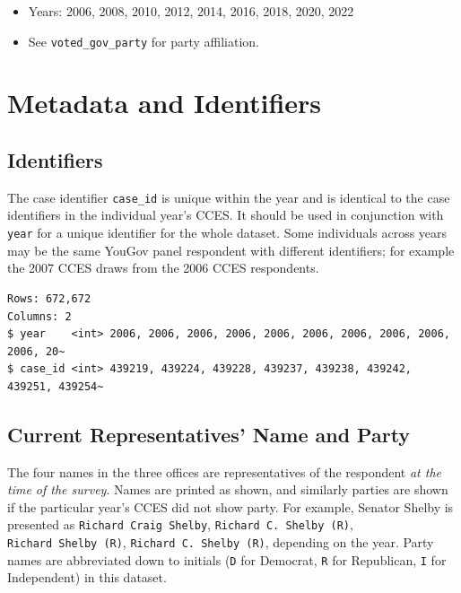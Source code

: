 \documentclass[10pt,article,oneside]{memoir}
\theoremstyle{definition}
\begin{document}
\begin{itemize}
\tightlist
\item
  Years: 2006, 2008, 2010, 2012, 2014, 2016, 2018, 2020, 2022
\item
  See \texttt{voted\_gov\_party} for party affiliation.
\end{itemize}

\newpage

\section{Metadata and Identifiers}\label{metadata-and-identifiers}

\subsection{Identifiers}\label{identifiers}

The case identifier \texttt{case\_id} is unique within the year and is
identical to the case identifiers in the individual year's CCES. It
should be used in conjunction with \texttt{year} for a unique identifier
for the whole dataset. Some individuals across years may be the same
YouGov panel respondent with different identifiers; for example the 2007
CCES draws from the 2006 CCES respondents.

\begin{verbatim}
Rows: 672,672
Columns: 2
$ year    <int> 2006, 2006, 2006, 2006, 2006, 2006, 2006, 2006, 2006, 2006, 20~
$ case_id <int> 439219, 439224, 439228, 439237, 439238, 439242, 439251, 439254~
\end{verbatim}

\subsection{Current Representatives' Name and
Party}\label{current-representatives-name-and-party}

The four names in the three offices are representatives of the
respondent \emph{at the time of the survey}. Names are printed as shown,
and similarly parties are shown if the particular year's CCES did not
show party. For example, Senator Shelby is presented as
\texttt{Richard\ Craig\ Shelby}, \texttt{Richard\ C.\ Shelby\ (R)},
\texttt{Richard\ Shelby\ (R)}, \texttt{Richard\ C.\ Shelby\ (R)},
depending on the year. Party names are abbreviated down to initials
(\texttt{D} for Democrat, \texttt{R} for Republican, \texttt{I} for
Independent) in this dataset.
\end{document}
